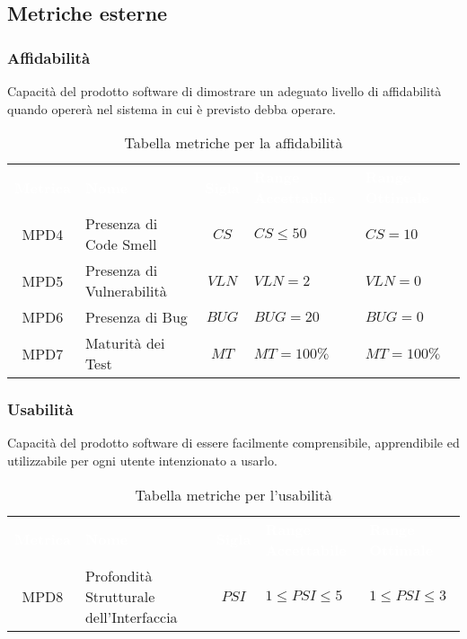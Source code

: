 \subsection{Metriche esterne}

\subsubsection{Affidabilità}
Capacità del prodotto software di dimostrare un adeguato livello di affidabilità quando opererà nel sistema in cui è previsto debba operare.

\begin{longtable}{ c C{4cm} c C{3.5cm} C{3.5cm}}
	\caption{Tabella metriche per la affidabilità}\\
	\textcolor{white}{\textbf{Metrica}} & \textcolor{white}{\textbf{Nome}} & \textcolor{white}{\textbf{Sigla}} & \textcolor{white}{\textbf{Range Accettabile}} & \textcolor{white}{\textbf{Range Ottimale}}\\
	MPD4 & Presenza di Code Smell & $CS$ & $CS \leq 50 $ & $CS = 10 $\\
	MPD5 & Presenza di Vulnerabilità & $VLN$ & $VLN = 2$ & $VLN = 0 $\\
	MPD6 & Presenza di Bug & $BUG$ & $BUG = 20 $ & $BUG = 0 $\\
	MPD7 & Maturità dei Test & $MT$ & $MT = 100\%$ & $MT = 100\%$\\
\end{longtable}

\vspace{0.3cm}  
\subsubsection{Usabilità}
Capacità del prodotto software di essere facilmente comprensibile, apprendibile ed utilizzabile per ogni utente intenzionato a usarlo.

\begin{longtable}{ c C{4cm} c C{3.5cm} C{3.5cm}}
	\caption{Tabella metriche per l'usabilità}\\
	\textcolor{white}{\textbf{Metrica}} & \textcolor{white}{\textbf{Nome}} & \textcolor{white}{\textbf{Sigla}} & \textcolor{white}{\textbf{Range Accettabile}} & \textcolor{white}{\textbf{Range Ottimale}}\\
	 MPD8 & Profondità Strutturale dell'Interfaccia & $PSI$ & $1 \leq PSI \leq 5$ &$1 \leq PSI \leq 3$\\
\end{longtable}
